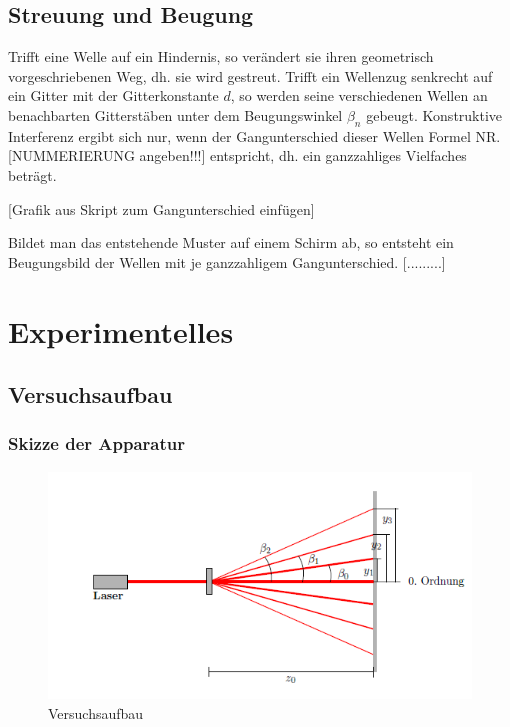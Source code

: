 \documentclass[12pt,a4paper,titlepage,headinclude,bibtotoc]{scrartcl}
\begin{document}
\subsection{Streuung und Beugung}
Trifft eine Welle auf ein Hindernis, so verändert sie ihren geometrisch vorgeschriebenen Weg, dh. sie wird gestreut. %
Trifft ein Wellenzug senkrecht auf ein Gitter mit der Gitterkonstante $d$, so werden seine verschiedenen Wellen an benachbarten Gitterstäben unter dem Beugungswinkel $\beta_n$ gebeugt. Konstruktive Interferenz ergibt sich nur, wenn der Gangunterschied dieser Wellen Formel NR. [NUMMERIERUNG angeben!!!] entspricht, dh. ein ganzzahliges Vielfaches beträgt.

[Grafik aus Skript zum Gangunterschied einfügen]

Bildet man das entstehende Muster auf einem Schirm ab, so entsteht ein Beugungsbild der Wellen mit je ganzzahligem Gangunterschied. [.........]

\section{Experimentelles}

\subsection{Versuchsaufbau}

\subsubsection{Skizze der Apparatur}
\begin{figure} [h]
\begin{center}
\includegraphics[scale=1]{Versuchsaufbau.png} \end{center}
\caption{Versuchsaufbau}
\end{figure}
\end{document}
